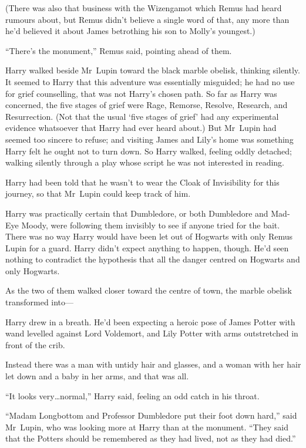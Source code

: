 (There was also that business with the Wizengamot which Remus had heard rumours about, but Remus didn’t believe a single word of that, any more than he’d believed it about James betrothing his son to Molly’s youngest.)

“There’s the monument,” Remus said, pointing ahead of them.

\later

Harry walked beside Mr~Lupin toward the black marble obelisk, thinking silently. It seemed to Harry that this adventure was essentially misguided; he had no use for grief counselling, that was not Harry’s chosen path. So far as Harry was concerned, the five stages of grief were Rage, Remorse, Resolve, Research, and Resurrection. (Not that the usual ‘five stages of grief’ had any experimental evidence whatsoever that Harry had ever heard about.) But Mr~Lupin had seemed too sincere to refuse; and visiting James and Lily’s home was something Harry felt he ought not to turn down. So Harry walked, feeling oddly detached; walking silently through a play whose script he was not interested in reading.

Harry had been told that he wasn’t to wear the Cloak of Invisibility for this journey, so that Mr~Lupin could keep track of him.

Harry was practically certain that Dumbledore, or both Dumbledore and Mad-Eye Moody, were following them invisibly to see if anyone tried for the bait. There was no way Harry would have been let out of Hogwarts with only Remus Lupin for a guard. Harry didn’t expect anything to happen, though. He’d seen nothing to contradict the hypothesis that all the danger centred on Hogwarts and only Hogwarts.

As the two of them walked closer toward the centre of town, the marble obelisk transformed into—

Harry drew in a breath. He’d been expecting a heroic pose of James Potter with wand levelled against Lord Voldemort, and Lily Potter with arms outstretched in front of the crib.

Instead there was a man with untidy hair and glasses, and a woman with her hair let down and a baby in her arms, and that was all.

“It looks very…normal,” Harry said, feeling an odd catch in his throat.

“Madam Longbottom and Professor Dumbledore put their foot down hard,” said Mr~Lupin, who was looking more at Harry than at the monument.
“They said that the Potters should be remembered as they had lived, not as they had died.”

